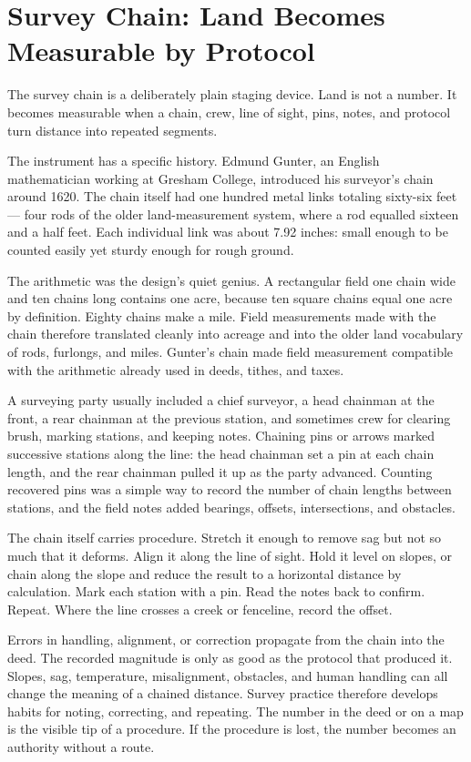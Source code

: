 \section{Survey Chain: Land Becomes Measurable by Protocol}

The survey chain is a deliberately plain staging device. Land is not a
number. It becomes measurable when a chain, crew, line of sight, pins,
notes, and protocol turn distance into repeated segments.

The instrument has a specific history. Edmund Gunter, an English
mathematician working at Gresham College, introduced his surveyor's chain
around 1620. The chain itself had one hundred metal links totaling sixty-six feet ---
four rods of the older land-measurement system, where a rod equalled
sixteen and a half feet. Each individual link was about 7.92
inches: small enough to be counted easily yet sturdy enough for rough
ground.

The arithmetic was the design's quiet genius. A rectangular field one
chain wide and ten chains long contains one acre, because ten square
chains equal one acre by definition. Eighty chains make a mile. Field
measurements made with the chain therefore translated cleanly into
acreage and into the older land vocabulary of rods, furlongs, and miles.
Gunter's chain made field measurement compatible with the arithmetic
already used in deeds, tithes, and taxes.

A surveying party usually included a chief surveyor, a head chainman at
the front, a rear chainman at the previous station, and sometimes crew for
clearing brush, marking stations, and keeping notes. Chaining pins or
arrows marked successive stations along the line: the head chainman set a
pin at each chain length, and the rear chainman pulled it up as the party
advanced. Counting recovered pins was a simple way to record the number
of chain lengths between stations, and the field notes added bearings,
offsets, intersections, and obstacles.

The chain itself carries procedure. Stretch it enough to remove sag but
not so much that it deforms. Align it along the line of sight. Hold it
level on slopes, or chain along the slope and reduce the result to a
horizontal distance by calculation. Mark each station with a pin. Read
the notes back to confirm. Repeat. Where the line crosses a creek or
fenceline, record the offset.

Errors in handling, alignment, or correction propagate from the chain
into the deed. The recorded magnitude is only as good as the protocol
that produced it. Slopes, sag, temperature, misalignment, obstacles, and
human handling can all change the meaning of a chained distance. Survey
practice therefore develops habits for noting, correcting, and repeating.
The number in the deed or on a map is the visible tip of a procedure. If
the procedure is lost, the number becomes an authority without a route.

